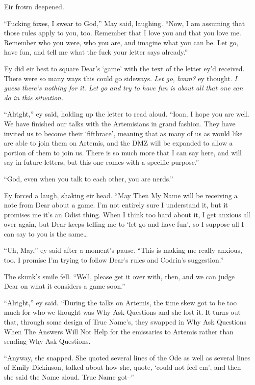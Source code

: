 Eir frown deepened.

``Fucking foxes, I swear to God,'' May said, laughing. ``Now, I am assuming that those rules apply to you, too. Remember that I love you and that you love me. Remember who you were, who you are, and imagine what you can be. Let go, have fun, and tell me what the fuck your letter says already.''

Ey did eir best to square Dear's `game' with the text of the letter ey'd received. There were so many ways this could go sideways. \emph{Let go, hmm?} ey thought. \emph{I guess there's nothing for it. Let go and try to have fun is about all that one can do in this situation.}

``Alright,'' ey said, holding up the letter to read aloud. ``Ioan, I hope you are well. We have finished our talks with the Artemisians in grand fashion. They have invited us to become their `fifthrace', meaning that as many of us as would like are able to join them on Artemis, and the DMZ will be expanded to allow a portion of them to join us. There is so much more that I can say here, and will say in future letters, but this one comes with a specific purpose.''

``God, even when you talk to each other, you are nerds.''

Ey forced a laugh, shaking eir head. ``May Then My Name will be receiving a note from Dear about a game. I'm not entirely sure I understand it, but it promises me it's an Odist thing. When I think too hard about it, I get anxious all over again, but Dear keeps telling me to `let go and have fun', so I suppose all I can say to you is the same\ldots{}

``Uh, May,'' ey said after a moment's pause. ``This is making me really anxious, too. I promise I'm trying to follow Dear's rules and Codrin's suggestion.''

The skunk's smile fell. ``Well, please get it over with, then, and we can judge Dear on what it considers a game soon.''

``Alright,'' ey said. ``During the talks on Artemis, the time skew got to be too much for who we thought was Why Ask Questions and she lost it. It turns out that, through some design of True Name's, they swapped in Why Ask Questions When The Answers Will Not Help for the emissaries to Artemis rather than sending Why Ask Questions.

``Anyway, she snapped. She quoted several lines of the Ode as well as several lines of Emily Dickinson, talked about how she, quote, `could not feel em', and then she said the Name aloud. True Name got--''

